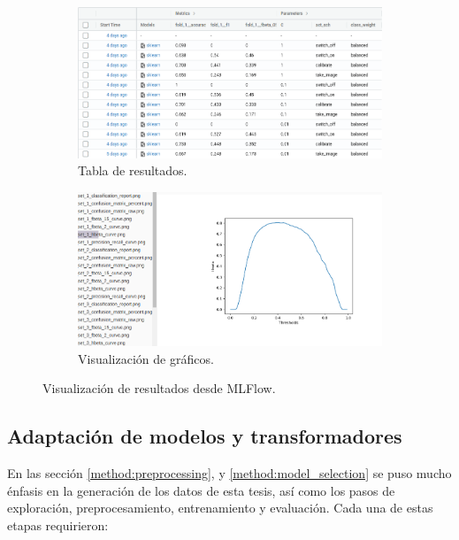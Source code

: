  \begin{figure}[t!]
    \begin{subfigure}[b]{\textwidth}
        \centering
        \includegraphics[width=\linewidth]{figures/runs_example_1.png}
        \caption{Tabla de resultados.}
    \end{subfigure}
    \hfill
    \begin{subfigure}[b]{\textwidth}
        \centering
        \includegraphics[width=\linewidth]{figures/runs_example_2.png}
        \caption{Visualización de gráficos.}
    \end{subfigure}
    \caption{Visualización de resultados desde MLFlow.}
    \label{fig:mlflow-runs}
\end{figure}

\subsection{Adaptación de modelos y transformadores}

En las sección \ref{method:preprocessing}, y \ref{method:model_selection} se
puso mucho énfasis en la generación de los datos de esta tesis, así como los
pasos de exploración, preprocesamiento, entrenamiento y evaluación. Cada una de
estas etapas requirieron:

